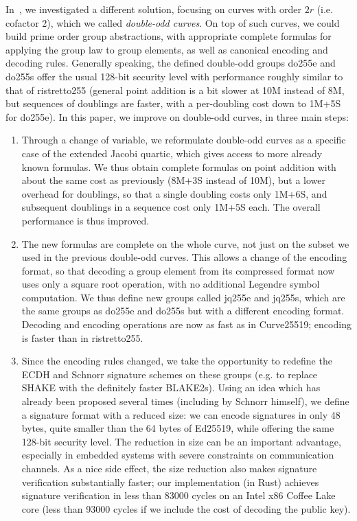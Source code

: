 \documentclass{llncs}
\begin{document}
In~\cite{Por2020-5}, we investigated a different solution, focusing on
curves with order $2r$ (i.e. cofactor 2), which we called
\emph{double-odd curves}. On top of such curves, we could build prime
order group abstractions, with appropriate complete formulas for
applying the group law to group elements, as well as canonical encoding
and decoding rules. Generally speaking, the defined double-odd groups
do255e and do255s offer the usual 128-bit security level with
performance roughly similar to that of ristretto255 (general point
addition is a bit slower at 10M instead of 8M, but sequences of
doublings are faster, with a per-doubling cost down to 1M+5S for
do255e). In this paper, we improve on double-odd curves, in three
main steps:
\begin{enumerate}

    \item Through a change of variable, we reformulate double-odd curves
    as a specific case of the extended Jacobi quartic, which gives
    access to more already known formulas\cite{HisWonCarDaw2009}. We
    thus obtain complete formulas on point addition with about the same
    cost as previously (8M+3S instead of 10M), but a lower overhead for
    doublings, so that a single doubling costs only 1M+6S, and
    subsequent doublings in a sequence cost only 1M+5S each. The overall
    performance is thus improved.

    \item The new formulas are complete on the whole curve, not just on
    the subset we used in the previous double-odd curves. This allows a
    change of the encoding format, so that decoding a group element from
    its compressed format now uses only a square root operation, with no
    additional Legendre symbol computation. We thus define new groups
    called jq255e and jq255s, which are the same groups as do255e and
    do255s but with a different encoding format. Decoding and encoding
    operations are now as fast as in Curve25519; encoding is faster than
    in ristretto255.

    \item Since the encoding rules changed, we take the opportunity to
    redefine the ECDH and Schnorr signature schemes on these groups
    (e.g. to replace SHAKE with the definitely faster BLAKE2s). Using an
    idea which has already been proposed several times (including by
    Schnorr himself), we define a signature format with a reduced size:
    we can encode signatures in only 48 bytes, quite smaller than the 64
    bytes of Ed25519, while offering the same 128-bit security level.
    The reduction in size can be an important advantage, especially in
    embedded systems with severe constraints on communication channels.
    As a nice side effect, the size reduction also makes signature
    verification substantially faster; our implementation (in Rust)
    achieves signature verification in less than 83000 cycles on an
    Intel x86 Coffee Lake core (less than 93000 cycles if we include the
    cost of decoding the public key).

\end{enumerate}
\end{document}
